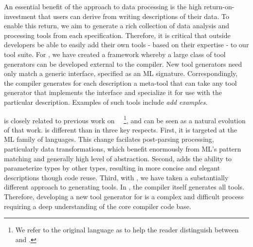 An essential benefit of the \pads{} approach to data processing is the
high return-on-investment that users can derive from writing 
descriptions of their data. To enable this return, we aim to generate
a rich collection of data analysis and processing tools from each
specification. Therefore, it is critical that outside
developers be able to easily add their own tools - based on their
expertise - to our tool suite.  For \padsml{}, we have created
a framework whereby a large class of tool
generators can be developed external to the compiler.  New tool
generators need only match a generic interface, specified as an ML
signature. Correspondingly, the compiler generates for each
description a meta-tool that can take any tool generator that
implements the interface and specialize it for use with the particular
description.  Examples of such tools include {\em add examples}.

\padsml{} is closely related to previous work on
\padsc{}~\cite{pads-pldi}~\footnote{We refer to the original \pads{}
  language as \padsc{} to help the reader distinguish between \padsc{}
  and \padsml{}.}, and can be seen as a natural evolution of that
work.  \padsml{} is different than \padsc{} in three key respects.
First, it is targeted at the ML family of languages. 
This change facilates post-parsing processing, particularly data
transformations, which benefit enormously from ML's pattern matching
and generally high level of abstraction. 
Second, \padsml{}
adds the ability to parameterize types by other types, resulting in
more concise and elegant descriptions though code reuse. Third, with
\padsml{}, we have taken a substantially different approach to
generating tools. In \padsc{}, the compiler itself generates all
tools.  Therefore,
developing a new tool generator for \padsc{} is a complex and
difficult process requiring a deep understanding of the core compiler
code base.



